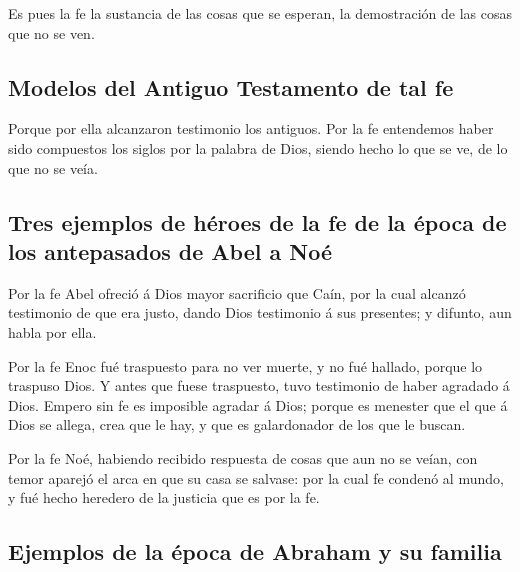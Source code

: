  Es pues la fe la sustancia de las cosas que se esperan, la
demostración de las cosas que no se ven.

\hypertarget{modelos-del-antiguo-testamento-de-tal-fe}{%
\subsection{Modelos del Antiguo Testamento de tal
fe}\label{modelos-del-antiguo-testamento-de-tal-fe}}

 Porque por ella alcanzaron testimonio los antiguos.
 Por la fe entendemos haber sido compuestos los siglos por
la palabra de Dios, siendo hecho lo que se ve, de lo que no se veía.

\hypertarget{tres-ejemplos-de-huxe9roes-de-la-fe-de-la-uxe9poca-de-los-antepasados-de-abel-a-nouxe9}{%
\subsection{Tres ejemplos de héroes de la fe de la época de los
antepasados \hspace{0pt}\hspace{0pt}de Abel a
Noé}\label{tres-ejemplos-de-huxe9roes-de-la-fe-de-la-uxe9poca-de-los-antepasados-de-abel-a-nouxe9}}

 Por la fe Abel ofreció á Dios mayor sacrificio que Caín,
por la cual alcanzó testimonio de que era justo, dando Dios testimonio á
sus presentes; y difunto, aun habla por ella.

 Por la fe Enoc fué traspuesto para no ver muerte, y no fué
hallado, porque lo traspuso Dios. Y antes que fuese traspuesto, tuvo
testimonio de haber agradado á Dios.  Empero sin fe es
imposible agradar á Dios; porque es menester que el que á Dios se
allega, crea que le hay, y que es galardonador de los que le buscan.

 Por la fe Noé, habiendo recibido respuesta de cosas que aun
no se veían, con temor aparejó el arca en que su casa se salvase: por la
cual fe condenó al mundo, y fué hecho heredero de la justicia que es por
la fe.

\hypertarget{ejemplos-de-la-uxe9poca-de-abraham-y-su-familia}{%
\subsection{Ejemplos de la época de Abraham y su
familia}\label{ejemplos-de-la-uxe9poca-de-abraham-y-su-familia}}

